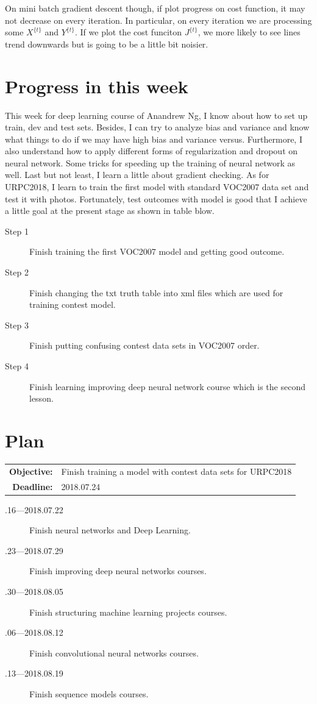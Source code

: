 \documentclass[a4paper]{article}
\begin{document}
On mini batch gradient descent though, if plot progress on cost function, it may not decrease on every iteration. In particular, on every iteration we are processing some $X^{\{t\}}$ and $Y^{\{t\}}$. If we plot the cost funciton $J^{\{t\}}$, we more likely to see lines trend downwards but is going to be a little bit noisier.



\section{Progress in this week}

This week for deep learning course of Anandrew Ng, I know about how to set up train, dev and test sets. Besides, I can try to analyze bias and variance and know what things to do if we may have high bias and variance versus. Furthermore, I also understand how to apply different forms of regularization and dropout on neural network. Some tricks for speeding up the training of neural network as well. Last but not least, I learn a little about gradient checking. As for URPC2018, I learn to train the first model with standard VOC2007 data set and test it with photos. Fortunately, test outcomes with model is good that I achieve a little goal at the present stage as shown in table blow.
\begin{description}
	\item [Step 1] Finish training the first VOC2007 model and getting good outcome.
	\item[Step 2] Finish changing the txt truth table into xml files which are used for training contest model.
	\item[Step 3] Finish putting confusing contest data sets in VOC2007 order.
	\item[Step 4] Finish learning improving deep neural network course which is the second lesson.\label{t1}
\end{description}

\section{Plan}

\begin{tabular}{rl}
	\textbf{Objective:} & Finish training a model with contest data sets for URPC2018 \\
	\textbf{Deadline:} & 2018.07.24
\end{tabular}

\begin{description}
	\item[.16---2018.07.22] Finish neural networks and Deep Learning.
	\item[.23---2018.07.29] Finish improving deep neural networks courses.
	\item[.30---2018.08.05] Finish structuring machine learning projects courses.
	\item[.06---2018.08.12] Finish convolutional neural networks courses.
	\item[.13---2018.08.19] Finish sequence models courses.
\end{description}





\end{document}
